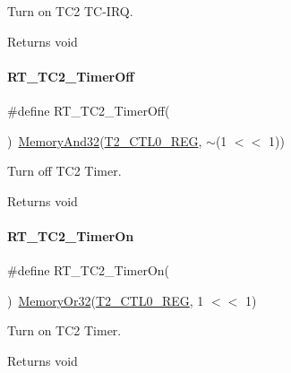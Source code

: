 Turn on T\+C2 T\+C-\/\+I\+RQ. 

\begin{DoxyReturn}{Returns}
void 
\end{DoxyReturn}
\mbox{\label{a00047_a4328299fe0323ef75508eadf9b937ba1}} 
\paragraph{\texorpdfstring{R\+T\+\_\+\+T\+C2\+\_\+\+Timer\+Off}{RT\_TC2\_TimerOff}}
{\footnotesize\ttfamily \#define R\+T\+\_\+\+T\+C2\+\_\+\+Timer\+Off(\begin{DoxyParamCaption}{ }\end{DoxyParamCaption})~\mbox{\hyperlink{a00020_ad87cedffcaadc51db22594fce55173d4}{Memory\+And32}}(\mbox{\hyperlink{a00020_adadaa0ab1ebbd7ba9b70dfd24c3ed44daf2e9deb36631241181cbf09e8d959475}{T2\+\_\+\+C\+T\+L0\+\_\+\+R\+EG}}, $\sim$(1 $<$$<$ 1))}



Turn off T\+C2 Timer. 

\begin{DoxyReturn}{Returns}
void 
\end{DoxyReturn}
\mbox{\label{a00047_ab274ee44af2080d68745b2ec3af06648}} 
\paragraph{\texorpdfstring{R\+T\+\_\+\+T\+C2\+\_\+\+Timer\+On}{RT\_TC2\_TimerOn}}
{\footnotesize\ttfamily \#define R\+T\+\_\+\+T\+C2\+\_\+\+Timer\+On(\begin{DoxyParamCaption}{ }\end{DoxyParamCaption})~\mbox{\hyperlink{a00020_a27874a97deab7cecdde5ddecf466e31e}{Memory\+Or32}}(\mbox{\hyperlink{a00020_adadaa0ab1ebbd7ba9b70dfd24c3ed44daf2e9deb36631241181cbf09e8d959475}{T2\+\_\+\+C\+T\+L0\+\_\+\+R\+EG}}, 1 $<$$<$ 1)}



Turn on T\+C2 Timer. 

\begin{DoxyReturn}{Returns}
void 
\end{DoxyReturn}


